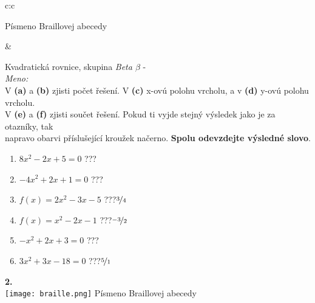 \documentclass[10pt]{report}
\begin{document}
\begin{tabular}{c:c}
\begin{minipage}[c][99mm][t]{0.49\linewidth}
\begin{center}
\begin{minipage}{0.20\linewidth}
\begin{center}
{\small Písmeno Braillovej abecedy}
\end{center}
\end{minipage}
\end{center}
\end{minipage}
&
\begin{minipage}[c][99mm][t]{0.49\linewidth}
\begin{center}
\vspace{7mm}
{\huge Kvadratická rovnice, skupina \textit{Beta $\beta$} -}\\[4.5mm]
\textit{Meno:}\phantom{xxxxxxxxxxxxxxxxxxxxxxxxxxxxxxxxxxxxxxxxxxxxxxxxxxxxxxxxxxxxxxxxx}\\[3.5mm]
V \textbf{(a)} a \textbf{(b)} zjisti počet řešení. V \textbf{(c)} x-ovú polohu vrcholu, a v \textbf{(d)} y-ovú polohu vrcholu.\\V \textbf{(e)} a \textbf{(f)} zjisti součet řešení. Pokud ti vyjde stejný výsledek jako je za otazníky, tak\\napravo obarvi příslušející kroužek načerno. \textbf{Spolu odevzdejte výsledné slovo}.\\[3mm]
\begin{minipage}{0.77\linewidth}
\begin{center}
\begin{varwidth}{\textwidth}
\begin{enumerate}
\large
\item $8x^2-2x+5=0$\quad \dotfill\; ???\;\dotfill {}
\item $-4x^2+2x+1=0$\quad \dotfill\; ???\;\dotfill {}
\item $f(x)=2x^2-3x-5$\quad \dotfill\; ???\;\dotfill \quad $\nicefrac{3}{4}$
\item $f(x)=x^2-2x-1$\quad \dotfill\; ???\;\dotfill \quad $\nicefrac{-3}{2}$
\item $-x^2+2x+3=0$\quad \dotfill\; ???\;\dotfill {}
\item $3x^2+3x-18=0$\quad \dotfill\; ???\;\dotfill \quad $\nicefrac{5}{1}$
\end{enumerate}
\end{varwidth}
\end{center}
\end{minipage}
\begin{minipage}{0.20\linewidth}
\begin{center}
{\Huge\bfseries 2.} \\[2mm]
\texttt{[image: braille.png]}
{\small Písmeno Braillovej abecedy}
\end{center}

\end{minipage}
\end{center}
\end{minipage}
\end{tabular}
\end{document}
